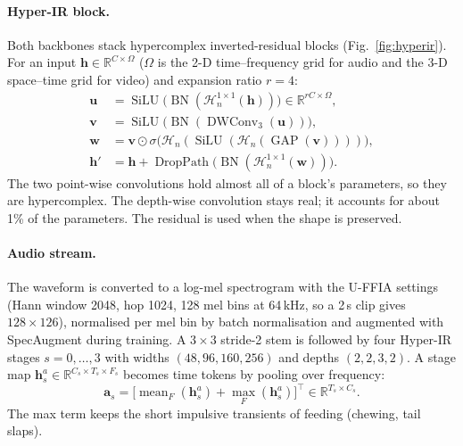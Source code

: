 \paragraph{Hyper-IR block.} Both backbones stack hypercomplex inverted-residual blocks
(Fig.~\ref{fig:hyperir}). For an input $\mathbf{h}\in\mathbb{R}^{C\times\Omega}$ ($\Omega$ is the 2-D
time--frequency grid for audio and the 3-D space--time grid for video) and expansion ratio $r=4$:
\begin{equation}
\begin{aligned}
  \mathbf{u} &= \operatorname{SiLU}\big(\operatorname{BN}(\mathcal{H}_n^{1\times1}(\mathbf{h}))\big)\in\mathbb{R}^{rC\times\Omega},\\
  \mathbf{v} &= \operatorname{SiLU}\big(\operatorname{BN}(\operatorname{DWConv}_{3}(\mathbf{u}))\big),\\
  \mathbf{w} &= \mathbf{v}\odot\sigma\big(\mathcal{H}_n(\operatorname{SiLU}(\mathcal{H}_n(\operatorname{GAP}(\mathbf{v}))))\big),\\
  \mathbf{h}' &= \mathbf{h} + \operatorname{DropPath}\big(\operatorname{BN}(\mathcal{H}_n^{1\times1}(\mathbf{w}))\big).
\end{aligned}
  \label{eq:hyperir}
\end{equation}
The two point-wise convolutions hold almost all of a block's parameters, so they are hypercomplex. The
depth-wise convolution stays real; it accounts for about 1\% of the parameters. The residual is used
when the shape is preserved.

\paragraph{Audio stream.} The waveform is converted to a log-mel spectrogram with the U-FFIA settings
(Hann window 2048, hop 1024, 128 mel bins at 64\,kHz, so a 2\,s clip gives $128\times126$),
normalised per mel bin by batch normalisation and augmented with SpecAugment during training. A
$3{\times}3$ stride-2 stem is followed by four Hyper-IR stages $s=0,\dots,3$ with widths
$(48,96,160,256)$ and depths $(2,2,3,2)$. A stage map $\mathbf{h}^{a}_{s}\in\mathbb{R}^{C_s\times T_s\times F_s}$
becomes time tokens by pooling over frequency:
\begin{equation}
  \mathbf{a}_s = \big[\operatorname{mean}_{F}(\mathbf{h}^{a}_s) + \operatorname{max}_{F}(\mathbf{h}^{a}_s)\big]^{\top}\in\mathbb{R}^{T_s\times C_s}.
  \label{eq:audiotokens}
\end{equation}
The max term keeps the short impulsive transients of feeding (chewing, tail slaps).

